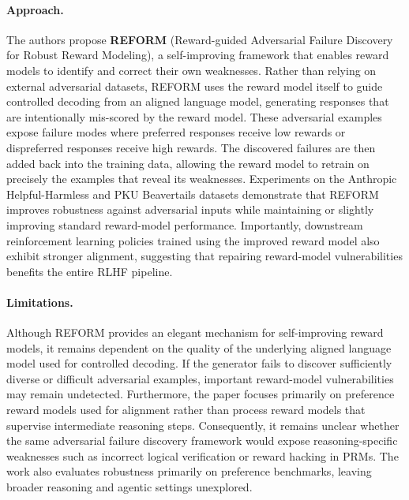 \documentclass[11pt]{article}
\begin{document}
\paragraph{Approach.}
The authors propose \textbf{REFORM} (Reward-guided Adversarial Failure Discovery for Robust Reward Modeling), a self-improving framework that enables reward models to identify and correct their own weaknesses. Rather than relying on external adversarial datasets, REFORM uses the reward model itself to guide controlled decoding from an aligned language model, generating responses that are intentionally mis-scored by the reward model. These adversarial examples expose failure modes where preferred responses receive low rewards or dispreferred responses receive high rewards. The discovered failures are then added back into the training data, allowing the reward model to retrain on precisely the examples that reveal its weaknesses. Experiments on the Anthropic Helpful-Harmless and PKU Beavertails datasets demonstrate that REFORM improves robustness against adversarial inputs while maintaining or slightly improving standard reward-model performance. Importantly, downstream reinforcement learning policies trained using the improved reward model also exhibit stronger alignment, suggesting that repairing reward-model vulnerabilities benefits the entire RLHF pipeline.

\paragraph{Limitations.}
Although REFORM provides an elegant mechanism for self-improving reward models, it remains dependent on the quality of the underlying aligned language model used for controlled decoding. If the generator fails to discover sufficiently diverse or difficult adversarial examples, important reward-model vulnerabilities may remain undetected. Furthermore, the paper focuses primarily on preference reward models used for alignment rather than process reward models that supervise intermediate reasoning steps. Consequently, it remains unclear whether the same adversarial failure discovery framework would expose reasoning-specific weaknesses such as incorrect logical verification or reward hacking in PRMs. The work also evaluates robustness primarily on preference benchmarks, leaving broader reasoning and agentic settings unexplored.
\end{document}
